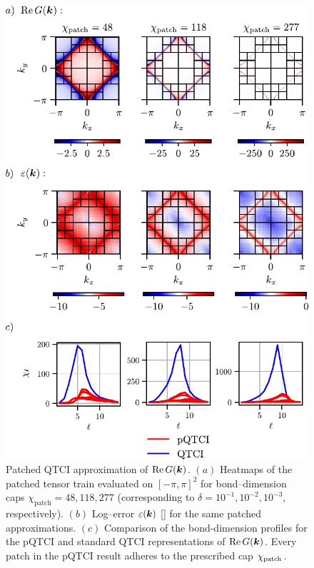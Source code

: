 \begin{figure}[htbp]
    \centering 
    \includegraphics{figures/2DGreenErrorHeatmap.pdf}
    \caption{Patched QTCI approximation of
           \(\operatorname{Re}G(\boldsymbol{k})\).
           $(a)$ Heatmaps of the patched tensor train evaluated on \([-\pi,\pi]^{2}\) for bond–dimension caps \(\chi_{\text{patch}}=48,118,277\) (corresponding to
           \(\delta=10^{-1},10^{-2},10^{-3}\), respectively).
           $(b)$ Log–error \(\varepsilon(\boldsymbol{k})\) []
           for the same patched approximations. 
           $(c)$ Comparison of the bond-dimension profiles for the pQTCI and standard QTCI representations of \(\operatorname{Re}G(\boldsymbol{k})\). Every patch in the pQTCI result adheres to the prescribed cap $\chi_{\text{patch}}$.}
    \label{fig:2DGreenErrorHeatmap}
\end{figure}
